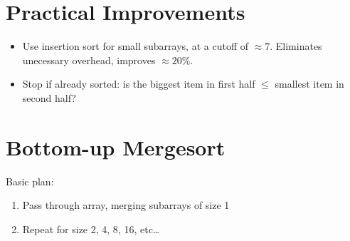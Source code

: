 \documentclass[11pt]{article}
\begin{document}
\section{Practical Improvements}

	\begin{itemize}
		\item Use insertion sort for small subarrays, at a cutoff of $\approx 7$. Eliminates unecessary overhead, improves $\approx 20\%$.
		\item Stop if already sorted: is the biggest item in first half $\leq$ smallest item in second half?
	\end{itemize}
	
\section{Bottom-up Mergesort}
	Basic plan:
		\begin{enumerate}
			\item Pass through array, merging subarrays of size 1
			\item Repeat for size 2, 4, 8, 16, etc\ldots
		\end{enumerate}
\end{document}
